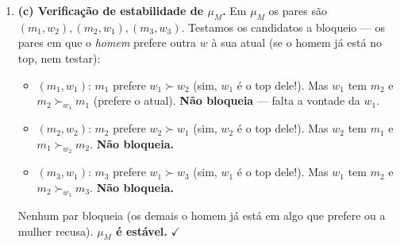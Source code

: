 \documentclass[11pt,a4paper]{article}
\begin{document}
\begin{enumerate}[leftmargin=2em,itemsep=4pt]
\smallskip
\noindent\textbf{Iteração 4.} $m_3$ (rejeitado) propõe ao próximo, $w_3$.
\begin{itemize}[leftmargin=1.5em,itemsep=1pt,topsep=2pt]
\item $w_3$ estava vazia: \textbf{aceita $m_3$}. Ninguém mais é rejeitado.
\end{itemize}
\textbf{Termina.} Resultado:
\[
\boxed{\;\mu_M:\quad m_1\!\leftrightarrow\! w_2,\;\; m_2\!\leftrightarrow\! w_1,\;\;
m_3\!\leftrightarrow\! w_3.\;} \tag{3.2}
\]
Foram $6$ propostas e $3$ rejeições — uma \textbf{cadeia} de deslocamentos em torno de $w_1$
($m_3$ tira $w_1$ de $m_1$; $m_1$ vai tirar $w_2$ de $m_2$; $m_2$ volta e retoma $w_1$,
expulsando $m_3$; $m_3$, sem opção boa, acha $w_3$ vazia).

\begin{empalavras}
A graça do DA é o efeito-dominó, e aqui ele gira em torno de $w_1$. Veja a história: $m_1$ e
$m_3$ disputam $w_1$ na largada; como $w_1$ prefere $m_3$, \emph{ela fica com $m_3$ e despeja
$m_1$} (iteração 1). $m_1$, despejado, vai para $w_2$ e \emph{rouba} dela o $m_2$, porque $w_2$
prefere $m_1$ (iteração 2). $m_2$, despejado, volta a $w_1$ — e como $w_1$ prefere $m_2$ a
$m_3$, \emph{retoma $w_1$ e agora é $m_3$ quem cai} (iteração 3)! $m_3$, sem opção boa, desce
até $w_3$, que estava sozinha (iteração 4). É um ``empurra-empurra'' que sempre \emph{converge},
porque cada homem só pode descer na sua lista um número finito de vezes (no máximo $3$ aqui).
A dica de execução: mantenha sempre uma tabelinha ``quem cada $w$ está segurando agora'' e
atualize linha a linha. Quem tenta fazer de cabeça erra.
\end{empalavras}

\item \textbf{(c) Verificação de estabilidade de $\mu_M$.} Em $\mu_M$ os pares são
$(m_1,w_2),(m_2,w_1),(m_3,w_3)$. Testamos os candidatos a bloqueio — os pares em que o
\emph{homem} prefere outra $w$ à sua atual (se o homem já está no top, nem testar):
\begin{itemize}[leftmargin=1.5em,itemsep=2pt,topsep=2pt]
\item $(m_1,w_1)$: $m_1$ prefere $w_1\succ w_2$ (sim, $w_1$ é o top dele!). Mas $w_1$ tem $m_2$
e $m_2\succ_{w_1} m_1$ (prefere o atual). \textbf{Não bloqueia} — falta a vontade da $w_1$.
\item $(m_2,w_2)$: $m_2$ prefere $w_2\succ w_1$ (sim, $w_2$ é o top dele!). Mas $w_2$ tem $m_1$
e $m_1\succ_{w_2} m_2$. \textbf{Não bloqueia.}
\item $(m_3,w_1)$: $m_3$ prefere $w_1\succ w_3$ (sim, $w_1$ é o top dele!). Mas $w_1$ tem $m_2$
e $m_2\succ_{w_1} m_3$. \textbf{Não bloqueia.}
\end{itemize}
Nenhum par bloqueia (os demais o homem já está em algo que prefere ou a mulher recusa).
\textbf{$\mu_M$ é estável.} $\checkmark$


\end{enumerate}
\end{document}
